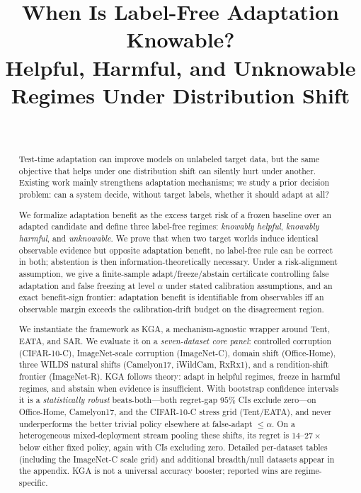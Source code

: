 \documentclass[conference]{IEEEtran}
\title{When Is Label-Free Adaptation Knowable? \\
Helpful, Harmful, and Unknowable Regimes Under Distribution Shift}
\author{\IEEEauthorblockN{Anonymous Authors}\\
\IEEEauthorblockA{Paper under double-blind review}}
\theoremstyle{plain}
\theoremstyle{definition}
\begin{document}
\maketitle

\begin{abstract}
Test-time adaptation can improve models on unlabeled target data, but the same
objective that helps under one distribution shift can silently hurt under another.
Existing work mainly strengthens adaptation mechanisms; we study a prior decision
problem: can a system decide, without target labels, whether it should adapt at all?

We formalize adaptation benefit as the excess target risk of a frozen baseline over
an adapted candidate and define three label-free regimes: \emph{knowably helpful},
\emph{knowably harmful}, and \emph{unknowable}. We prove that when two target worlds
induce identical observable evidence but opposite adaptation benefit, no label-free
rule can be correct in both; abstention is then information-theoretically necessary.
Under a risk-alignment assumption, we give a finite-sample adapt/freeze/abstain
certificate controlling false adaptation and false freezing at level $\alpha$ under
stated calibration assumptions, and an exact benefit-sign frontier: adaptation benefit
is identifiable from observables iff an observable margin exceeds the calibration-drift
budget on the disagreement region.

We instantiate the framework as \textsc{KGA}, a mechanism-agnostic wrapper around
Tent, EATA, and SAR. We evaluate it on a \emph{seven-dataset core panel}: controlled corruption (CIFAR-10-C),
ImageNet-scale corruption (ImageNet-C), domain shift (Office-Home), three WILDS natural shifts
(Camelyon17, iWildCam, RxRx1), and a rendition-shift frontier (ImageNet-R). \textsc{KGA} follows
theory: adapt in helpful regimes, freeze in harmful regimes, and abstain when evidence is
insufficient. With bootstrap confidence intervals it is a \emph{statistically robust}
beats-both---both regret-gap $95\%$ CIs exclude zero---on Office-Home, Camelyon17, and the
CIFAR-10-C stress grid (Tent/EATA), and never underperforms the better trivial policy elsewhere
at false-adapt $\le\alpha$. On a heterogeneous mixed-deployment stream pooling these shifts, its
regret is $14$--$27\times$ below either fixed policy, again with CIs excluding zero.
Detailed per-dataset tables (including the ImageNet-C scale grid) and additional breadth/null datasets appear in the appendix.
\textsc{KGA} is not a universal accuracy booster; reported wins are regime-specific.
\end{abstract}
\end{document}
